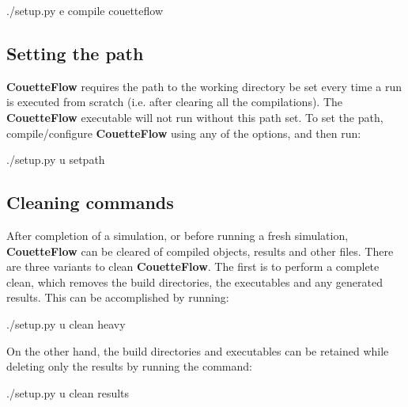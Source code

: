 \documentclass[letterpaper,10pt,english]{sphinxmanual}
\begin{document}
\begin{sphinxVerbatim}[commandchars=\\\{\}]
\PYGZdl{} ./setup.py \PYGZhy{}e compile couetteflow
\end{sphinxVerbatim}


\subsection{Setting the path}
\label{\detokenize{couettepyfiles/compile:setting-the-path}}
{\color{red}\bfseries{}\textbar{}CouetteFlow\textbar{}} requires the path to the working directory be set every time a run is executed from scratch (i.e. after clearing all the compilations). The {\color{red}\bfseries{}\textbar{}CouetteFlow\textbar{}} executable  will not run without this path set. To set the path, compile/configure {\color{red}\bfseries{}\textbar{}CouetteFlow\textbar{}} using any of the options, and then run:

\begin{sphinxVerbatim}[commandchars=\\\{\}]
\PYGZdl{} ./setup.py \PYGZhy{}u set\PYGZus{}path
\end{sphinxVerbatim}


\subsection{Cleaning commands}
\label{\detokenize{couettepyfiles/compile:cleaning-commands}}
After completion of a simulation, or before running a fresh simulation, {\color{red}\bfseries{}\textbar{}CouetteFlow\textbar{}} can be cleared of compiled objects, results and other files. There are three variants to clean {\color{red}\bfseries{}\textbar{}CouetteFlow\textbar{}}. The first is to perform a complete clean, which removes the build directories, the executables and any generated results. This can be accomplished by running:

\begin{sphinxVerbatim}[commandchars=\\\{\}]
\PYGZdl{} ./setup.py \PYGZhy{}u clean heavy
\end{sphinxVerbatim}

On the other hand, the build directories and executables can be retained while deleting only the results by running the command:

\begin{sphinxVerbatim}[commandchars=\\\{\}]
\PYGZdl{} ./setup.py \PYGZhy{}u clean results
\end{sphinxVerbatim}
\end{document}
